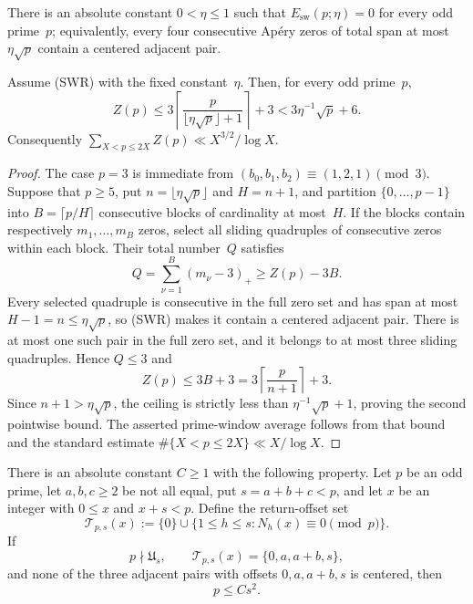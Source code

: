 \begin{hypothesis}
\label{hyp:qc-swr}
There is an absolute constant $0<\eta\le1$ such that
$E_{\mathrm{sw}}(p;\eta)=0$ for every odd prime~$p$; equivalently,
every four consecutive Ap\'ery zeros of total span at most
$\eta\sqrt p$ contain a centered adjacent pair.
\end{hypothesis}

\begin{corollary}
\label{cor:qc-swr}
Assume \textup{(SWR)} with the fixed constant~$\eta$.  Then, for every
odd prime~$p$,
\[
 Z(p)\le
 3\left\lceil
   \frac{p}{\lfloor\eta\sqrt p\rfloor+1}
  \right\rceil+3
 <3\eta^{-1}\sqrt p+6.
\]
Consequently
$\sum_{X<p\le2X}Z(p)\ll X^{3/2}/\log X$.
\end{corollary}

\begin{proof}
The case $p=3$ is immediate from
$(b_0,b_1,b_2)\equiv(1,2,1)\pmod3$.  Suppose that $p\ge5$, put
$n=\lfloor\eta\sqrt p\rfloor$ and $H=n+1$, and partition
$\{0,\ldots,p-1\}$ into
$B=\lceil p/H\rceil$ consecutive blocks of cardinality at most~$H$.
If the blocks contain respectively $m_1,\ldots,m_B$ zeros, select all
sliding quadruples of consecutive zeros within each block.  Their total
number~$Q$ satisfies
\[
 Q=\sum_{\nu=1}^{B}(m_\nu-3)_+
 \ge Z(p)-3B.
\]
Every selected quadruple is consecutive in the full zero set and has
span at most $H-1=n\le\eta\sqrt p$, so \textup{(SWR)} makes it contain
a centered adjacent pair.  There is at most one such pair in the full zero set,
and it belongs to at most three sliding quadruples.  Hence $Q\le3$ and
\[
 Z(p)\le3B+3
 =3\left\lceil\frac{p}{n+1}\right\rceil+3.
\]
Since $n+1>\eta\sqrt p$, the ceiling is strictly less than
$\eta^{-1}\sqrt p+1$, proving the second pointwise bound.  The asserted
prime-window average follows from that bound and the standard estimate
$\#\{X<p\le2X\}\ll X/\log X$.
\end{proof}

\begin{hypothesis}
\label{hyp:qc-qprs}
There is an absolute constant $C\ge1$ with the following property.  Let
$p$ be an odd prime, let $a,b,c\ge2$ be not all equal, put
$s=a+b+c<p$, and let $x$ be an integer with $0\le x$ and $x+s<p$.
Define the return-offset set
\[
 \mathcal T_{p,s}(x)
 :=\{0\}\cup\{1\le h\le s:N_h(x)\equiv0\pmod p\}.
\]
If
\[
 p\nmid\mathfrak U_s,
 \qquad
 \mathcal T_{p,s}(x)=\{0,a,a+b,s\},
\]
and none of the three adjacent pairs with offsets
$0,a,a+b,s$ is centered, then
\[
 p\le C s^2.
\]
\end{hypothesis}

